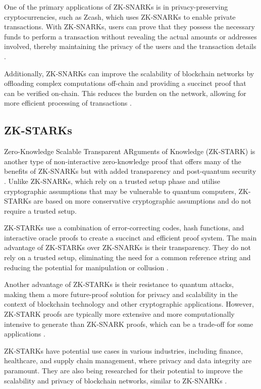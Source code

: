 One of the primary applications of ZK-SNARKs is in privacy-preserving cryptocurrencies, such as Zcash, which uses ZK-SNARKs to enable private transactions. With ZK-SNARKs, users can prove that they possess the necessary funds to perform a transaction without revealing the actual amounts or addresses involved, thereby maintaining the privacy of the users and the transaction details \cite{hopwood2020zcash}.

Additionally, ZK-SNARKs can improve the scalability of blockchain networks by offloading complex computations off-chain and providing a succinct proof that can be verified on-chain. This reduces the burden on the network, allowing for more efficient processing of transactions \cite{bensasson2019scalable}.

\subsection{ZK-STARKs}
Zero-Knowledge Scalable Transparent ARguments of Knowledge (ZK-STARK) is another type of non-interactive zero-knowledge proof that offers many of the benefits of ZK-SNARKs but with added transparency and post-quantum security \cite{bensasson2019aurora}. Unlike ZK-SNARKs, which rely on a trusted setup phase and utilise cryptographic assumptions that may be vulnerable to quantum computers, ZK-STARKs are based on more conservative cryptographic assumptions and do not require a trusted setup.

ZK-STARKs use a combination of error-correcting codes, hash functions, and interactive oracle proofs to create a succinct and efficient proof system. The main advantage of ZK-STARKs over ZK-SNARKs is their transparency. They do not rely on a trusted setup, eliminating the need for a common reference string and reducing the potential for manipulation or collusion \cite{bensasson2018scalable}.

Another advantage of ZK-STARKs is their resistance to quantum attacks, making them a more future-proof solution for privacy and scalability in the context of blockchain technology and other cryptographic applications. However, ZK-STARK proofs are typically more extensive and more computationally intensive to generate than ZK-SNARK proofs, which can be a trade-off for some applications \cite{bensasson2020primer}.

ZK-STARKs have potential use cases in various industries, including finance, healthcare, and supply chain management, where privacy and data integrity are paramount. They are also being researched for their potential to improve the scalability and privacy of blockchain networks, similar to ZK-SNARKs \cite{maller2019sonic}.

